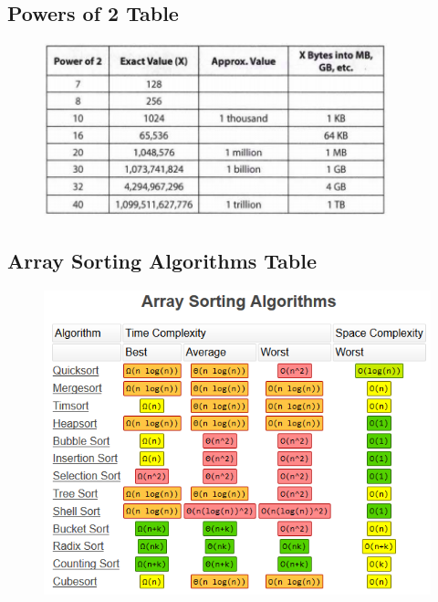 \documentclass{article}
\begin{document}
\subsection{Powers of 2 Table}

\begin{figure}[h]
    \centering
    \includegraphics[width=10cm]{powers-of-two.png}
\end{figure}

\subsection{Array Sorting Algorithms Table}
\begin{figure}[h]
    \centering
    \includegraphics[width=13cm]{Array_sorting_algorithms.png}
\end{figure}
\end{document}
